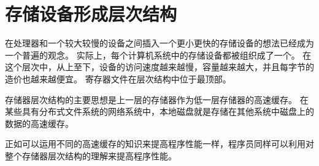 \section{存储设备形成层次结构}
{
    在处理器和一个较大较慢的设备之间插入一个更小更快的存储设备的想法已经成为一个普遍的观念。
    实际上，每个计算机系统中的存储设备都被组织成了一个。
    在这个层次中，从上至下，设备的访问速度越来越慢，容量越来越大，并且每字节的造价也越来越便宜。
    寄存器文件在层次结构中位于最顶部。

    存储器层次结构的主要思想是上一层的存储器作为低一层存储器的高速缓存。
    在某些具有分布式文件系统的网络系统中，本地磁盘就是存储在其他系统中磁盘上的数据的高速缓存。

    正如可以运用不同的高速缓存的知识来提高程序性能一样，程序员同样可以利用对整个存储器层次结构的理解来提高程序性能。
}

\endinput
